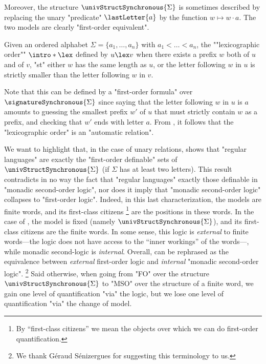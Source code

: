 Moreover, the structure $\univStructSynchronous{\Sigma}$ is sometimes described by replacing
the unary "predicate" $\lastLetter{a}$ by the function $w \mapsto w\cdot a$.
The two models are clearly "first-order equivalent".

\begin{example}
	\AP\label{ex:lexicographic-is-automatic}
	Given an ordered alphabet $\Sigma = \{a_1,\dotsc,a_n\}$ with $a_1 < \dotsc < a_n$,
	the \AP""lexicographic order"" $\intro*\lex$ defined by $u \lex v$ when there exists 
	a prefix $w$ both of $u$ and of $v$, "st" either $w$ has the same length as $u$,
	or the letter following $w$ in $u$ is strictly smaller than the letter following $w$ in $v$.
	
	Note that this can be defined by a "first-order formula" over $\signatureSynchronous{\Sigma}$
	since saying that the letter following $w$ in $u$ is $a$ amounts to
	guessing the smallest prefix $w'$ of $u$ that must strictly contain $w$ as a prefix,
	and checking that $w'$ ends with letter $a$.
	From , it follows that the "lexicographic order"
	is an "automatic relation".
\end{example}

We want to highlight that, in the case of unary relations,
 shows that "regular languages" are exactly
the "first-order definable" sets of $\univStructSynchronous{\Sigma}$
(if $\Sigma$ has at least two letters).
This result contradicts in no way the fact that "regular languages" exactly those definable
in "monadic second-order logic", nor does it imply that "monadic second-order logic"
collapses to "first-order logic". Indeed, in this last characterization,
the models are finite words, and its first-class citizens%
\footnote{By ``first-class citizens'' we mean the objects over which
we can do first-order quantification.} are the positions in these words.
In the case of , the model is fixed (namely $\univStructSynchronous{\Sigma}$), and its first-class citizens are the finite words.
In some sense, this logic is \emph{external} to finite words---the logic does not have access to the
``inner workings'' of the words---, while monadic second-logic is \emph{internal}.
Overall,  can be rephrased as the equivalence between
\emph{external} first-order logic and \emph{internal} "monadic second-order logic".%
\footnote{We thank Géraud Sénizergues for suggesting this terminology to us.}
Said otherwise, when going from "FO" over the structure $\univStructSynchronous{\Sigma}$ to "MSO" 
over the structure of a finite word, we gain one level of quantification "via" the logic,
but we lose one level of quantification "via" the change of model.
 

